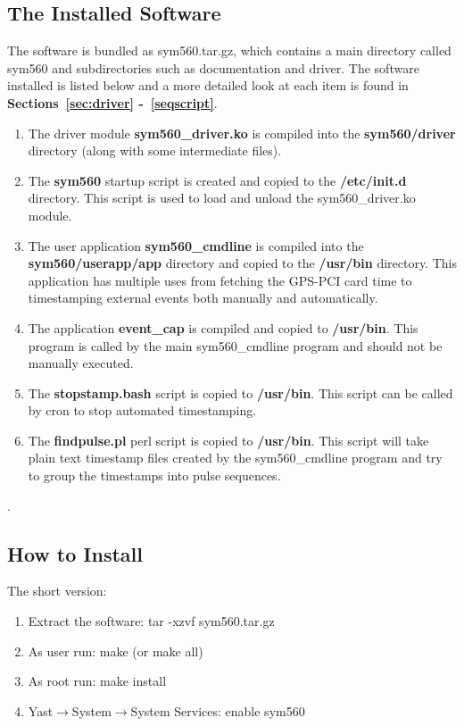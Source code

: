 \documentclass[11pt]{article}
\begin{document}
\subsection{The Installed Software} \label{subsec:whatinstall}
The software is bundled as sym560.tar.gz, which contains a main directory called sym560 and subdirectories such as documentation and driver.
 The software installed is listed below and a more detailed look at each item is found in \textbf{Sections~\ref{sec:driver} -~\ref{seqscript}}.
\begin{enumerate}
 \item The driver module \textbf{sym560\_driver.ko} is compiled into the \textbf{sym560/driver} directory (along with some intermediate files).
 \item The \textbf{sym560} startup script is created and copied to the \textbf{/etc/init.d} directory.
  This script is used to load and unload the sym560\_driver.ko module.
 \item The user application \textbf{sym560\_cmdline} is compiled into the \textbf{sym560/userapp/app} directory and copied to the \textbf{/usr/bin} directory.
  This application has multiple uses from fetching the GPS-PCI card time to timestamping external events both manually and automatically.
 \item The application \textbf{event\_cap} is compiled and copied to \textbf{/usr/bin}.
  This program is called by the main sym560\_cmdline program and should not be manually executed.
 \item The \textbf{stopstamp.bash} script is copied to \textbf{/usr/bin}.
  This script can be called by cron to stop automated timestamping.
 \item The \textbf{findpulse.pl} perl script is copied to \textbf{/usr/bin}.
  This script will take plain text timestamp files created by the sym560\_cmdline program and try to group the timestamps into pulse sequences.
\end{enumerate}
.

\subsection{How to Install} \label{subsec:howinstall}
The short version:
\begin{enumerate}
 \item Extract the software: tar -xzvf sym560.tar.gz
 \item As user run: make (or make all)
 \item As root run: make install
 \item Yast$\rightarrow$System$\rightarrow$System Services: enable sym560
\end{enumerate}
\end{document}
